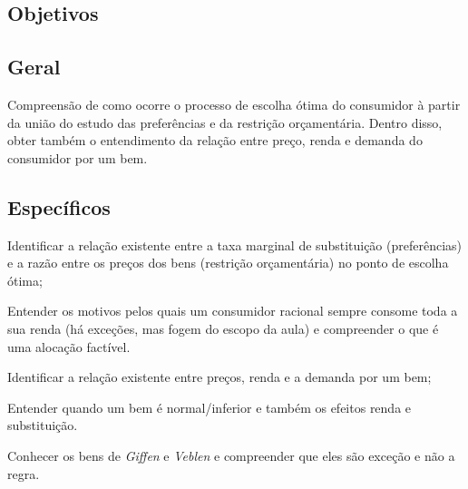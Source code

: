 \documentclass[
	article,			%
	12pt,				%
	twoside,			%
	a4paper,			%
	section=TITLE,		%
	english,			%
	brazil,				%
	sumario=tradicional
]{abntex2-modelo-plano-de-aula}
\begin{document}

\frenchspacing 



\imprimirletterUFSC





\textual
\pagestyle{notasUFSC}



\begin{snugshade}
	\section{\textbf{Objetivos}} %
\end{snugshade}

\subsection{Geral} %

Compreensão de como ocorre o processo de escolha ótima do consumidor à partir da união do estudo das preferências e da restrição orçamentária. Dentro disso, obter também o entendimento da relação entre preço, renda e demanda do consumidor por um bem.

\subsection{Específicos} %

\begin{outline}
	
	\1 Identificar a relação existente entre a taxa marginal de substituição (preferências) e a razão entre os preços dos bens (restrição orçamentária) no ponto de escolha ótima;
	
	\2 Entender os motivos pelos quais um consumidor racional sempre consome toda a sua renda (há exceções, mas fogem do escopo da aula) e compreender o que é uma alocação factível.
	
	\1 Identificar a relação existente entre preços, renda e a demanda por um bem;
	
	\2 Entender quando um bem é normal/inferior e também os efeitos renda e substituição.
	
	\2 Conhecer os bens de \textit{Giffen} e \textit{Veblen} e compreender que eles são exceção e não a regra.

\end{outline}%
\end{document}
